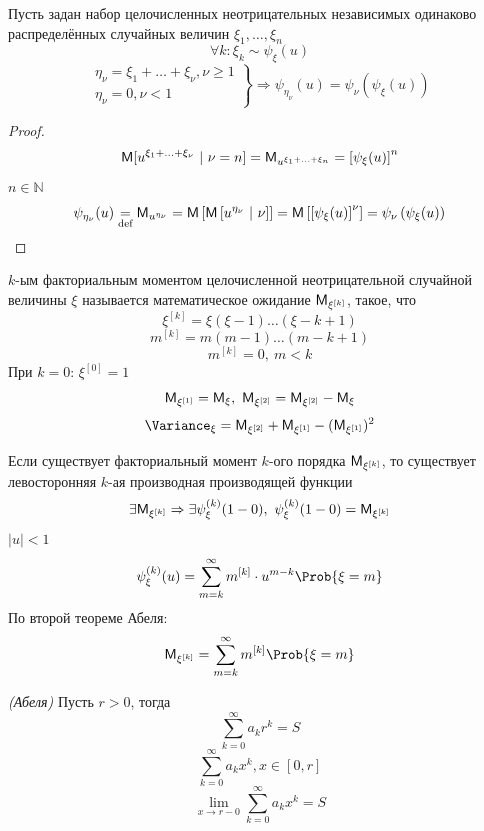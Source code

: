\begin{theorem}
	Пусть задан набор целочисленных неотрицательных независимых одинаково распределённых случайных величин $\xi_1, \ldots, \xi_n$
\[
	\forall k: \xi_k \sim \psi_{\xi} (u)
\]
\[
	\left.
	\begin{aligned}
	\eta_{\nu} = \xi_1 + \ldots + \xi_{\nu}, \nu \geqslant 1 \\
	\eta_{\nu} = 0, \nu < 1
	\end{aligned}
	\right	\} \Rightarrow \psi_{\eta_{\nu}} (u) = \psi_{\nu} (\psi_{\xi} (u))
\]
\end{theorem}
\begin{proof}
\[
	\mathsf{M} [u^{\xi_1 + \ldots + \xi_{\nu}} \ | \ \nu = n] = \mathsf{M}_{u^{\xi_1 + \ldots + \xi_n}} = \left[ \psi_{\xi} (u) \right]^n
\]
$n \in \mathbb{N}$
\[
	\psi_{\eta_{\nu}} (u) \underset{\textrm{def}}{=} \mathsf{M}_{u^{\eta_{\nu}}} = \mathsf{M} \left[ \mathsf{M} \left[ u^{\eta_{\nu}} \ | \ \nu \right] \right] = \mathsf{M} \left[ \left[ \psi_{\xi} (u) \right]^{\nu} \right] = \psi_{\nu} \left( \psi_{\xi} (u)\right)
\]
\end{proof}
\begin{definition}
	$k$-ым факториальным моментом целочисленной неотрицательной случайной величины $\xi$ называется математическое ожидание $\mathsf{M}_{{\xi}^{[k]}}$, такое, что
    \[
	    \xi^{[k]} = \xi (\xi - 1) \ldots (\xi - k + 1)
    \] 
	\[
		m^{[k]} = m (m - 1) \ldots (m - k + 1)
	\]
	\[
		m^{[k]} = 0, \ m < k
	\]
	При $k = 0$: $\xi^{[0]} = 1$
	\[
		\MExpect_{\xi^{[1]}} = \MExpect_{\xi}, \ \MExpect_{\xi^{[2]}} = \MExpect_{\xi^{[2]}} - \MExpect_{\xi}
	\]
	\[
		\Variance_{\xi} = \MExpect_{\xi^{[2]}} + \MExpect_{\xi^{[1]}} - (\MExpect_{\xi^{[1]}})^2
	\]
\end{definition}
\begin{theorem}
	Если существует факториальный момент $k$-ого порядка $\mathsf{M}_{\xi^{[k]}}$, то существует левосторонняя $k$-ая производная производящей функции
	\[
		\exists \MExpect_{\xi^{[k]}} \Rightarrow \exists \psi_{\xi}^{(k)} (1 - 0), \ \psi_{\xi}^{(k)} (1 - 0) = \MExpect_{\xi^{[k]}}
	\]
$|u| < 1$
\[
	\psi_{\xi}^{(k)} (u) = \sum\limits_{m = k}^{\infty} m^{[k]} \cdot u^{m - k} \Prob \{ \xi = m \}
\]
По второй теореме Абеля:
	\[
		\MExpect_{\xi^{[k]}} = \sum\limits_{m = k}^{\infty} m^{[k]} \Prob \{ \xi = m \}
	\]
\end{theorem}
\begin{theorem}
	\textit{(Абеля)} Пусть $r > 0$, тогда
	\[
		\sum\limits_{k = 0}^{\infty} a_k r^k = S
	\]
	\[
		\sum\limits_{k = 0}^{\infty} a_k x^k, x \in [0, r]
	\]
	\[
		\lim\limits_{x \to r - 0} \sum\limits_{k = 0}^{\infty} a_k x^k = S
	\]
\end{theorem}
